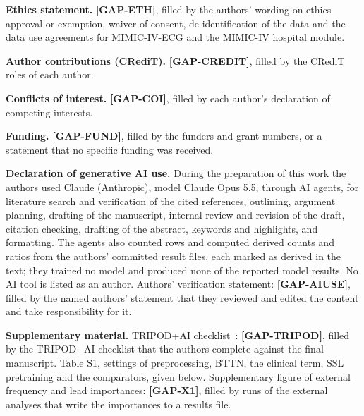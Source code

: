 \documentclass[preprint,12pt]{elsarticle}
\begin{document}
\textbf{Ethics statement.} \textbf{[GAP-ETH]}, filled by the authors' wording on ethics approval or exemption, waiver of consent, de-identification of the data and the data use agreements for MIMIC-IV-ECG and the MIMIC-IV hospital module.

\textbf{Author contributions (CRediT).} \textbf{[GAP-CREDIT]}, filled by the CRediT roles of each author.

\textbf{Conflicts of interest.} \textbf{[GAP-COI]}, filled by each author's declaration of competing interests.

\textbf{Funding.} \textbf{[GAP-FUND]}, filled by the funders and grant numbers, or a statement that no specific funding was received.

\textbf{Declaration of generative AI use.} During the preparation of this work the authors used Claude (Anthropic), model Claude Opus 5.5, through AI agents, for literature search and verification of the cited references, outlining, argument planning, drafting of the manuscript, internal review and revision of the draft, citation checking, drafting of the abstract, keywords and highlights, and formatting. The agents also counted rows and computed derived counts and ratios from the authors' committed result files, each marked as derived in the text; they trained no model and produced none of the reported model results. No AI tool is listed as an author. Authors' verification statement: \textbf{[GAP-AIUSE]}, filled by the named authors' statement that they reviewed and edited the content and take responsibility for it.

\textbf{Supplementary material.} TRIPOD+AI checklist~\cite{collins2024}: \textbf{[GAP-TRIPOD]}, filled by the TRIPOD+AI checklist that the authors complete against the final manuscript. Table S1, settings of preprocessing, BTTN, the clinical term, SSL pretraining and the comparators, given below. Supplementary figure of external frequency and lead importances: \textbf{[GAP-X1]}, filled by runs of the external analyses that write the importances to a results file.
\end{document}
